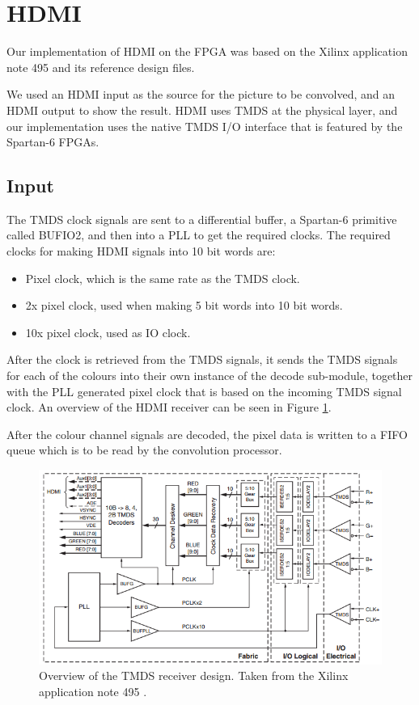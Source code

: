 \section{HDMI}
Our implementation of HDMI on the FPGA was based on the Xilinx application note 495 \cite{xapp495} and its reference design files.

We used an HDMI input as the source for the picture to be convolved, and an HDMI output to show the result.
HDMI uses TMDS at the physical layer, and our implementation uses the native TMDS I/O interface that is featured by the Spartan-6 FPGAs.

\subsection{Input}
The TMDS clock signals are sent to a differential buffer, a Spartan-6 primitive called BUFIO2, and then into a PLL to get the required clocks. The required clocks for making HDMI signals into 10 bit words are:
\begin{itemize}
    \item   Pixel clock, which is the same rate as the TMDS clock.
    \item   2x pixel clock, used when making 5 bit words into 10 bit words.
    \item   10x pixel clock, used as IO clock.
\end{itemize}

After the clock is retrieved from the TMDS signals, it sends the TMDS signals for each of the colours into their own instance of the decode sub-module, together with the PLL generated pixel clock that is based on the incoming TMDS signal clock.
An overview of the HDMI receiver can be seen in Figure \ref{fig:TMDSReceiver}.

After the colour channel signals are decoded, the pixel data is written to a FIFO queue which is to be read by the convolution processor.

\begin{figure}[h!]
    \centering
    \includegraphics[width=\linewidth]{img/TMDSreceiverdesign.png}
    \caption{Overview of the TMDS receiver design. Taken from the Xilinx application note 495 \cite{xapp495}.}
    \label{fig:TMDSReceiver}
\end{figure}


